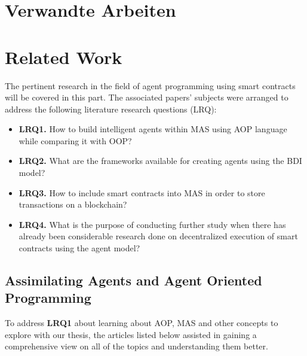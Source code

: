 {\chapter{Verwandte Arbeiten}}
{\chapter{Related Work}}
\label{sec:related}


The pertinent research in the field of agent programming using smart contracts will be covered in this part. The associated papers' subjects were arranged to address the following literature research questions (LRQ): 
\begin{itemize}[label={}]
    \item \textbf{LRQ1.} How to build intelligent agents within \ac{MAS} using \ac{AOP} language while comparing it with \ac{OOP}? \\

    \item \textbf{LRQ2.} What are the frameworks available for creating agents using the \ac{BDI} model?\\
    
    \item \textbf{LRQ3.} How to include smart contracts into \ac{MAS} in order to store transactions on a blockchain?\\

    \item \textbf{LRQ4.} What is the purpose of conducting further study when there has already been considerable research done on decentralized execution of smart contracts using the agent model?

\end{itemize}

\section{Assimilating Agents and Agent Oriented Programming}

To address \textbf{LRQ1} about learning about \ac{AOP}, \ac{MAS} and other concepts to explore with our thesis, the articles listed below assisted in gaining a comprehensive view on all of the topics and understanding them better.

